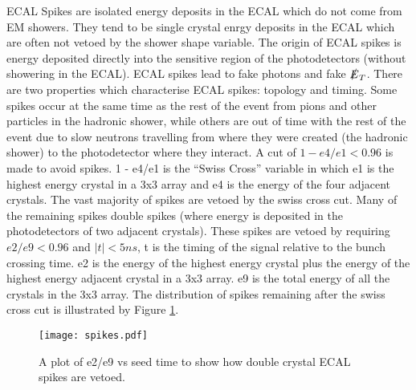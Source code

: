 ECAL Spikes are isolated energy deposits in the ECAL which do not come from EM 
showers. They tend to be single crystal enrgy deposits in the ECAL which are 
often not vetoed by the shower shape variable. The origin of ECAL spikes is
energy deposited directly into the sensitive region of the photodetectors
(without showering in the ECAL). ECAL spikes lead to fake photons and fake 
$\slashed{E}_{T}$. There are two properties which characterise ECAL spikes: topology and 
timing. Some spikes occur at the same time as the rest of the event from pions 
and other particles in the hadronic shower, while others are out of time with 
the rest of the event due to slow neutrons travelling from where they were 
created (the hadronic shower) to the photodetector where they interact. A cut of 
$1 - e4/e1 < 0.96$ is made to avoid spikes. 1 - e4/e1 is the ``Swiss Cross'' 
variable in which e1 is the highest energy crystal in a 3x3 array and e4 is the 
energy of the four adjacent crystals. The vast majority of spikes are vetoed by 
the swiss cross cut. Many of the remaining spikes double spikes (where energy is 
deposited in the photodetectors of two adjacent crystals). These spikes are 
vetoed by requiring $e2/e9 < 0.96$ and $|t| < 5\unit{ns}$, t is the timing of 
the signal relative to the bunch crossing time. e2 is the energy of the highest 
energy crystal plus the energy of the highest energy adjacent crystal in a 3x3 
array. e9 is the total energy of all the crystals in the 3x3 array. The 
distribution of spikes remaining after the swiss cross cut is illustrated by 
Figure \ref{fig:spikes}.

\begin{figure}
\begin{center}
\texttt{[image: spikes.pdf]}
\end{center}
\caption{A plot of e2/e9 vs seed time to show how double crystal ECAL spikes are
vetoed.}
\label{fig:spikes}
\end{figure}

